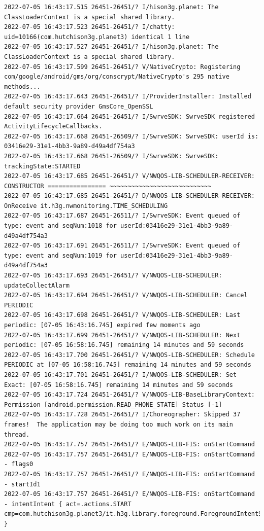 \documentclass[a4paper,12pt]{book}
\begin{document}
\begin{lstlisting}
2022-07-05 16:43:17.515 26451-26451/? I/hison3g.planet: The ClassLoaderContext is a special shared library.
2022-07-05 16:43:17.523 26451-26451/? I/chatty: uid=10166(com.hutchison3g.planet3) identical 1 line
2022-07-05 16:43:17.527 26451-26451/? I/hison3g.planet: The ClassLoaderContext is a special shared library.
2022-07-05 16:43:17.599 26451-26451/? V/NativeCrypto: Registering com/google/android/gms/org/conscrypt/NativeCrypto's 295 native methods...
2022-07-05 16:43:17.643 26451-26451/? I/ProviderInstaller: Installed default security provider GmsCore_OpenSSL
2022-07-05 16:43:17.664 26451-26451/? I/SwrveSDK: SwrveSDK registered ActivityLifecycleCallbacks.
2022-07-05 16:43:17.668 26451-26509/? I/SwrveSDK: SwrveSDK: userId is: 03416e29-31e1-4bb3-9a89-d49a4df754a3
2022-07-05 16:43:17.668 26451-26509/? I/SwrveSDK: SwrveSDK: trackingState:STARTED
2022-07-05 16:43:17.685 26451-26451/? V/NWQOS-LIB-SCHEDULER-RECEIVER: CONSTRUCTOR ================ ~~~~~~~~~~~~~~~~~~~~~~~~~~~~
2022-07-05 16:43:17.685 26451-26451/? D/NWQOS-LIB-SCHEDULER-RECEIVER: OnReceive it.h3g.nwmonitoring.TIME_SCHEDULING
2022-07-05 16:43:17.687 26451-26511/? I/SwrveSDK: Event queued of type: event and seqNum:1018 for userId:03416e29-31e1-4bb3-9a89-d49a4df754a3
2022-07-05 16:43:17.691 26451-26511/? I/SwrveSDK: Event queued of type: event and seqNum:1019 for userId:03416e29-31e1-4bb3-9a89-d49a4df754a3
2022-07-05 16:43:17.693 26451-26451/? V/NWQOS-LIB-SCHEDULER: updateCollectAlarm
2022-07-05 16:43:17.694 26451-26451/? V/NWQOS-LIB-SCHEDULER: Cancel PERIODIC
2022-07-05 16:43:17.698 26451-26451/? V/NWQOS-LIB-SCHEDULER: Last periodic: [07-05 16:43:16.745] expired few moments ago
2022-07-05 16:43:17.699 26451-26451/? V/NWQOS-LIB-SCHEDULER: Next periodic: [07-05 16:58:16.745] remaining 14 minutes and 59 seconds
2022-07-05 16:43:17.700 26451-26451/? V/NWQOS-LIB-SCHEDULER: Schedule PERIODIC at [07-05 16:58:16.745] remaining 14 minutes and 59 seconds
2022-07-05 16:43:17.701 26451-26451/? I/NWQOS-LIB-SCHEDULER: Set Exact: [07-05 16:58:16.745] remaining 14 minutes and 59 seconds
2022-07-05 16:43:17.724 26451-26451/? V/NWQOS-LIB-BaseLibraryContext: Permission [android.permission.READ_PHONE_STATE] Status [-1]
2022-07-05 16:43:17.728 26451-26451/? I/Choreographer: Skipped 37 frames!  The application may be doing too much work on its main thread.
2022-07-05 16:43:17.757 26451-26451/? E/NWQOS-LIB-FIS: onStartCommand
2022-07-05 16:43:17.757 26451-26451/? E/NWQOS-LIB-FIS: onStartCommand - flags0
2022-07-05 16:43:17.757 26451-26451/? E/NWQOS-LIB-FIS: onStartCommand - startId1
2022-07-05 16:43:17.757 26451-26451/? E/NWQOS-LIB-FIS: onStartCommand - intentIntent { act=.actions.START cmp=com.hutchison3g.planet3/it.h3g.library.foreground.ForegroundIntentService }

\end{lstlisting}
\end{document}
